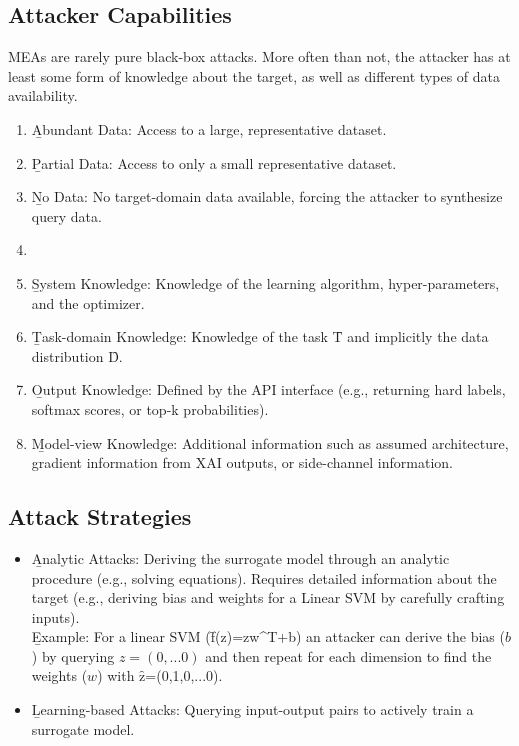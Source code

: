\subsection{Attacker Capabilities}
MEAs are rarely pure black-box attacks. More often than not, the attacker has at least some form of knowledge about the target, as well as different types of data availability.
\begin{enumerate}
\item[D1.] \b{Abundant Data}: Access to a large, representative dataset.
\item[D2.] \b{Partial Data}: Access to only a small representative dataset.
\item[D3.] \b{No Data}: No target-domain data available, forcing the attacker to synthesize query data.
\item[]
\item[K1.] \b{System Knowledge}: Knowledge of the learning algorithm, hyper-parameters, and the optimizer.
\item[K2.] \b{Task-domain Knowledge}: Knowledge of the task \f{T} and implicitly the data distribution \f{D}.
\item[K3.] \b{Output Knowledge}: Defined by the API interface (e.g., returning hard labels, softmax scores, or top-k probabilities).
\item[K4.] \b{Model-view Knowledge}: Additional information such as assumed architecture, gradient information from XAI outputs, or side-channel information.
\end{enumerate}



\subsection{Attack Strategies}
\begin{itemize}
\item \b{Analytic Attacks}: Deriving the surrogate model through an analytic procedure (e.g., solving equations). Requires detailed information about the target (e.g., deriving bias and weights for a Linear SVM by carefully crafting inputs).\\[.5em]
\b{Example}: For a linear SVM (\f{f(z)=zw^T+b}) an attacker can derive the bias ($b$) by querying $z=(0,...0)$ and then repeat for each dimension to find the weights ($w$) with \f{z=(0,1,0,...0)}.

\item \b{Learning-based Attacks}: Querying input-output pairs to actively train a surrogate model.
\end{itemize}



